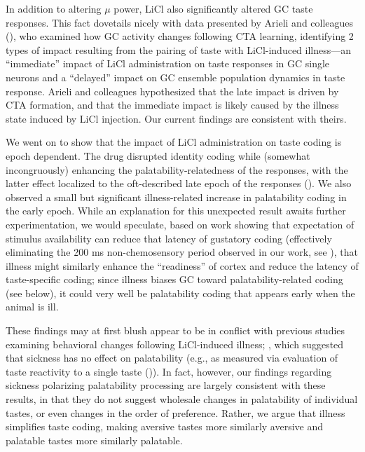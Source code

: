 \begin{refsection}
In addition to altering \(\mu\) power, LiCl also significantly altered GC taste responses. This fact dovetails nicely with data presented by Arieli and colleagues (\cite{arieli2022a}), who examined how GC activity changes following CTA learning, identifying 2 types of impact resulting from the pairing of taste with LiCl-induced illness—an “immediate” impact of LiCl administration on taste responses in GC single neurons and a “delayed” impact on GC ensemble population dynamics in taste response. Arieli and colleagues hypothesized that the late impact is driven by CTA formation, and that the immediate impact is likely caused by the illness state induced by LiCl injection. Our current findings are consistent with theirs.

We went on to show that the impact of LiCl administration on taste coding is epoch dependent. The drug disrupted identity coding while (somewhat incongruously) enhancing the palatability-relatedness of the responses, with the latter effect localized to the oft-described late epoch of the responses (\cite{katz-a,katz2001a,sadacca2016a}). We also observed a small but significant illness-related increase in palatability coding in the early epoch. While an explanation for this unexpected result awaits further experimentation, we would speculate, based on work showing that expectation of stimulus availability can reduce that latency of gustatory coding (effectively eliminating the 200 ms non-chemosensory period observed in our work, see \cite{samuelsen2012a,gutierrez2010a,stapleton2006a,graham2014a,bouaichi2020a,dikecligil2020a}), that illness might similarly enhance the “readiness” of cortex and reduce the latency of taste-specific coding; since illness biases GC toward palatability-related coding (see below), it could very well be palatability coding that appears early when the animal is ill.

These findings may at first blush appear to be in conflict with previous studies examining behavioral changes following LiCl-induced illness; \cite{spector1988a,baird2005a,eckel1996a}, which suggested that sickness has no effect on palatability (e.g., as measured via evaluation of taste reactivity to a single taste (\cite{spector1988a})). In fact, however, our findings regarding sickness polarizing palatability processing are largely consistent with these results, in that they do not suggest wholesale changes in palatability of individual tastes, or even changes in the order of preference. Rather, we argue that illness simplifies taste coding, making aversive tastes more similarly aversive and palatable tastes more similarly palatable.


\end{refsection}
